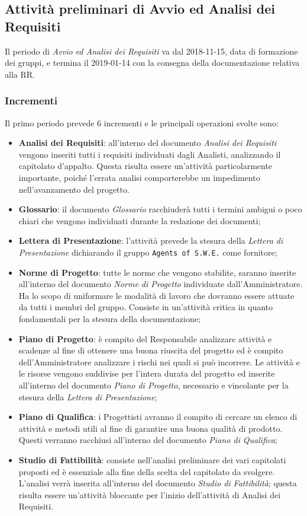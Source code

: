 \subsection{Attività preliminari di Avvio ed Analisi dei Requisiti}
\label{Apaar}

Il periodo di \textit{Avvio ed Analisi dei Requisiti} va dal 2018-11-15, data di formazione dei gruppi, e termina il 2019-01-14 con la consegna della documentazione relativa alla RR.

\newpage
\subsubsection{Incrementi}

Il primo periodo prevede 6 incrementi e le principali operazioni svolte sono: 
\begin{itemize}
	\item \textbf{Analisi dei Requisiti}: all'interno del documento \textit{Analisi dei Requisiti} vengono inseriti tutti i requisiti individuati dagli Analisti, analizzando il capitolato d'appalto. Questa risulta essere un'attività particolarmente importante, poiché l'errata analisi comporterebbe un impedimento nell'avanzamento del progetto.
	\item \textbf{Glossario}: il documento \textit{Glossario} racchiuderà tutti i termini ambigui o poco chiari che vengono individuati durante la redazione dei documenti;
	\item \textbf{Lettera di Presentazione}: l'attività prevede la stesura della \textit{Lettera di Presentazione} dichiarando il gruppo \texttt{Agents of S.W.E.} come fornitore;
	\item \textbf{Norme di Progetto}: tutte le norme che vengono stabilite, saranno inserite all'interno del documento \textit{Norme di Progetto} individuate dall'Amministratore. Ha lo scopo di uniformare le modalità di lavoro che dovranno essere attuate da tutti i membri del gruppo. Consiste in un'attività critica in quanto fondamentali per la stesura della documentazione;
	\item \textbf{Piano di Progetto}: è compito del Responsabile analizzare attività e scadenze al fine di ottenere una buona riuscita del progetto ed è compito dell'Amministratore analizzare i rischi nei quali si può incorrere. Le attività e le risorse vengono suddivise per l'intera durata del progetto ed inserite all'interno del documento \textit{Piano di Progetto}, necessario e vincolante per la stesura della \textit{Lettera di Presentazione};
	\item \textbf{Piano di Qualifica}: i Progettisti avranno il compito di cercare un elenco di attività e metodi utili al fine di garantire una buona qualità di prodotto. Questi verranno racchiusi all'interno del documento \textit{Piano di Qualifica};
	\item \textbf{Studio di Fattibilità}: consiste nell'analisi preliminare dei vari capitolati proposti ed è essenziale alla fine della scelta del capitolato da svolgere. L'analisi verrà inserita all'interno del documento \textit{Studio di Fattibilità}; questa risulta essere un'attività bloccante per l'inizio dell'attività di Analisi dei Requisiti.  
\end{itemize}
